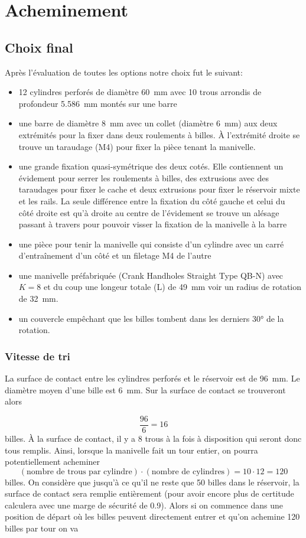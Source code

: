 \section{Acheminement}
\subsection{Choix final}
Après l'évaluation de toutes les options notre choix fut le suivant:
\begin{itemize}
	\item \num{12} cylindres perforés de diamètre \SI{60}{\milli\metre} avec \num{10} trous arrondis de profondeur \SI{5.586}{\milli\metre} montés sur une barre
	\item une barre de diamètre \SI{8}{\milli\metre} avec un collet (diamètre \SI{6}{\milli\metre}) aux deux extrémités pour la fixer dans deux roulements à billes. À l'extrémité droite se trouve un taraudage (M4) pour fixer la pièce tenant la manivelle.
	\item une grande fixation quasi-symétrique des deux cotés. Elle contiennent un évidement pour serrer les roulements à billes, des extrusions avec des taraudages pour fixer le cache et deux extrusions pour fixer le réservoir mixte et les rails. La seule différence entre la fixation du côté gauche et celui du côté droite est qu'à droite au centre de l'évidement se trouve un alésage passant à travers pour pouvoir visser la fixation de la manivelle à la barre 
	\item une pièce pour tenir la manivelle qui consiste d'un cylindre avec un carré d'entraînement d'un côté et un filetage M4 de l'autre
	\item une manivelle préfabriquée (Crank Handholes Straight Type QB-N) avec $K = 8$ et du coup une longeur totale (L) de \SI{49}{\milli\metre} voir un radius de rotation de \SI{32}{\milli\metre}.
	\item un couvercle empêchant que les billes tombent dans les derniers \ang{30} de la rotation.
\end{itemize}


\subsubsection{Vitesse de tri}
La surface de contact entre les cylindres perforés et le réservoir est de \SI{96}{\milli\metre}. Le diamètre moyen d'une bille est \SI{6}{\milli\metre}. Sur la surface de contact se trouveront alors

\[\frac{\num{96}}{\num{6}} = \num{16}\]
billes. À la surface de contact, il y a \num{8} trous à la fois à disposition qui seront donc tous remplis. Ainsi, lorsque la manivelle fait un tour entier, on pourra potentiellement acheminer 
\[(\text{nombre de trous par cylindre}) \cdot (\text{nombre de cylindres}) = \num{10} \cdot \num{12} = \num{120}\]
billes.
On considère que jusqu'à ce qu'il ne reste que \num{50} billes dans le réservoir, la surface de contact sera remplie entièrement (pour avoir encore plus de certitude calculera avec une marge de sécurité de \num{0.9}).
Alors si on commence dans une position de départ où les billes peuvent directement entrer et qu'on achemine \num{120} billes par tour on va

